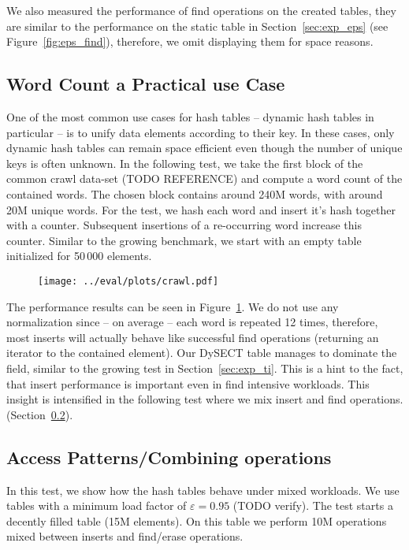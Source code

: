 \documentclass[a4paper,UKenglish]{lipics-v2016}
\begin{document}
We also measured the performance of find operations on the created
tables, they are similar to the performance on the static table in
Section~\ref{sec:exp_eps} (see Figure~\ref{fig:eps_find}), therefore,
we omit displaying them for space reasons.

\subsection{Word Count a Practical use Case}
One of the most common use cases for hash tables -- dynamic hash
tables in particular -- is to unify data elements according to their
key.  In these cases, only dynamic hash tables can remain space
efficient even though the number of unique keys is often unknown.  In
the following test, we take the first block of the common crawl
data-set (TODO REFERENCE) and compute a word count of the contained
words.  The chosen block contains around 240M words, with around 20M
unique words. For the test, we hash each word and insert it's hash
together with a counter.  Subsequent insertions of a re-occurring word
increase this counter.  Similar to the growing benchmark, we start
with an empty table initialized for 50\,000 elements.

\begin{figure}[ht]
  \centering
  \texttt{[image: ../eval/plots/crawl.pdf]}
  \caption{\label{fig:crawl} }
\end{figure}

The performance results can be seen in Figure~\ref{fig:crawl}.  We do
not use any normalization since -- on average -- each word is repeated
12 times, therefore, most inserts will actually behave like successful
find operations (returning an iterator to the contained element).  Our
DySECT table manages to dominate the field, similar to the growing
test in Section~\ref{sec:exp_ti}.  This is a hint to the fact, that
insert performance is important even in find intensive workloads.
This insight is intensified in the following test where we mix insert
and find operations.  (Section~\ref{sec:exp_mix}).


\subsection{Access Patterns/Combining operations}
\label{sec:exp_mix}
In this test, we show how the hash tables behave under mixed
workloads.  We use tables with a minimum load factor of $\varepsilon =
0.95$ (TODO verify).  The test starts a decently filled table
(15M elements).  On this table we perform 10M operations mixed between inserts and
find/erase operations.
\end{document}
